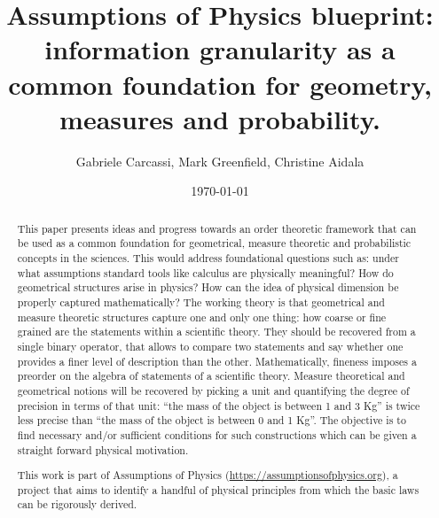 \documentclass[11pt]{article}
\title{Assumptions of Physics blueprint: information granularity as a common foundation for geometry, measures and probability.}
\author{Gabriele Carcassi, Mark Greenfield, Christine Aidala }
\date{\today}
\begin{document}
\maketitle

\begin{abstract}
    This paper presents ideas and progress towards an order theoretic framework that can be used as a common foundation for geometrical, measure theoretic and probabilistic concepts in the sciences. This would address foundational questions such as: under what assumptions standard tools like calculus are physically meaningful? How do geometrical structures arise in physics? How can the idea of physical dimension be properly captured mathematically? The working theory is that geometrical and measure theoretic structures capture one and only one thing: how coarse or fine grained are the statements within a scientific theory. They should  be recovered from a single binary operator, that allows to compare two statements and say whether one provides a finer level of description than the other. Mathematically, fineness imposes a preorder on the algebra of statements of a scientific theory. Measure theoretical and geometrical notions will be recovered by picking a unit and quantifying the degree of precision in terms of that unit: ``the mass of the object is between 1 and 3 Kg'' is twice less precise than ``the mass of the object is between 0 and 1 Kg''. The objective is to find necessary and/or sufficient conditions for such constructions which can be given a straight forward physical motivation.
    
	This work is part of Assumptions of Physics (\url{https://assumptionsofphysics.org}), a project that aims to identify a handful of physical principles from which the basic laws can be rigorously derived.
\end{abstract}
\end{document}
